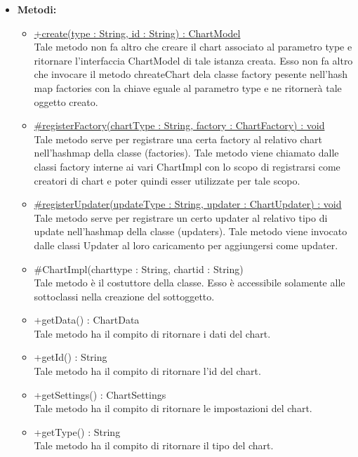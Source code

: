 \begin{itemize}
			\item \textbf{Metodi:}
				\begin{itemize}
				\setlength{\itemsep}{5pt}
				
					\item[\ding{111}] {\underline{+create(type : String, id : String) : ChartModel}} \\ [1mm] Tale metodo non fa altro che creare il chart associato al parametro type e ritornare l'interfaccia ChartModel di tale istanza creata. Esso non fa altro che invocare il metodo chreateChart dela classe factory pesente nell'hash map factories con la chiave eguale al parametro type e ne ritornerà tale oggetto creato.
					\item[\ding{111}] {\underline{\#registerFactory(chartType : String, factory : ChartFactory) : void}} \\ [1mm] Tale metodo serve per registrare una certa factory al relativo chart nell'hashmap della classe (factories). Tale metodo viene chiamato dalle classi factory interne ai vari ChartImpl con lo scopo di registrarsi come creatori di chart e poter quindi esser utilizzate per tale scopo.
					\item[\ding{111}] {\underline{\#registerUpdater(updateType : String, updater : ChartUpdater) : void}} \\ [1mm] Tale metodo serve per registrare un certo updater al relativo tipo di update nell'hashmap della classe (updaters). Tale metodo viene invocato dalle classi Updater al loro caricamento per aggiungersi come updater.
					\item[\ding{111}] {{\#ChartImpl(charttype : String, chartid : String)}} \\ [1mm] Tale metodo è il costuttore della classe. Esso è accessibile solamente alle sottoclassi nella creazione del sottoggetto.
					\item[\ding{111}] {{+getData() : ChartData}} \\ [1mm] Tale metodo ha il compito di ritornare i dati del chart.
					\item[\ding{111}] {{+getId() : String}} \\ [1mm] Tale metodo ha il compito di ritornare l'id del chart.
					\item[\ding{111}] {{+getSettings() : ChartSettings}} \\ [1mm] Tale metodo ha il compito di ritornare le impostazioni del chart.
					\item[\ding{111}] {{+getType() : String}} \\ [1mm] Tale metodo ha il compito di ritornare il tipo del chart.

\end{itemize}
\end{itemize}
